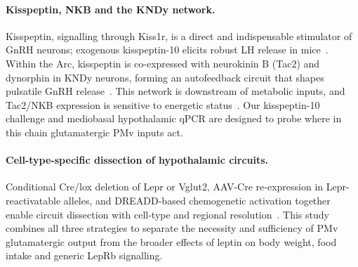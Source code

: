 \paragraph{Kisspeptin, NKB and the KNDy network.} Kisspeptin, signalling through Kiss1r, is a direct and indispensable stimulator of GnRH neurons; exogenous kisspeptin-10 elicits robust LH release in mice~\cite{gottsch2004role}. Within the Arc, kisspeptin is co-expressed with neurokinin B (Tac2) and dynorphin in KNDy neurons, forming an autofeedback circuit that shapes pulsatile GnRH release~\cite{navarro2011regulation,navarro2013interactions}. This network is downstream of metabolic inputs, and Tac2/NKB expression is sensitive to energetic status~\cite{amstalden2011neuroendocrine}. Our kisspeptin-10 challenge and mediobasal hypothalamic qPCR are designed to probe where in this chain glutamatergic PMv inputs act.

\paragraph{Cell-type-specific dissection of hypothalamic circuits.} Conditional Cre/lox deletion of Lepr or Vglut2, AAV-Cre re-expression in Lepr-reactivatable alleles, and DREADD-based chemogenetic activation together enable circuit dissection with cell-type and regional resolution~\cite{berglund2012direct,kim2012foxo1}. This study combines all three strategies to separate the necessity and sufficiency of PMv glutamatergic output from the broader effects of leptin on body weight, food intake and generic LepRb signalling.
